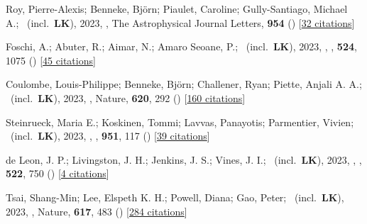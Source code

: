 \item[{\color{numcolor}\scriptsize93}] Roy, Pierre-Alexis; Benneke, Bj{\"o}rn; Piaulet, Caroline; Gully-Santiago, Michael A.; \etal\ (incl.\ \textbf{LK}), 2023, , The Astrophysical Journal Letters, \textbf{954} () [\href{https://ui.adsabs.harvard.edu/abs/2023ApJ...954L..52R}{32 citations}]

\item[{\color{numcolor}\scriptsize92}] Foschi, A.; Abuter, R.; Aimar, N.; Amaro Seoane, P.; \etal\ (incl.\ \textbf{LK}), 2023, , \mnras, \textbf{524}, 1075 () [\href{https://ui.adsabs.harvard.edu/abs/2023MNRAS.524.1075F}{45 citations}]

\item[{\color{numcolor}\scriptsize91}] Coulombe, Louis-Philippe; Benneke, Bj{\"o}rn; Challener, Ryan; Piette, Anjali A. A.; \etal\ (incl.\ \textbf{LK}), 2023, , Nature, \textbf{620}, 292 () [\href{https://ui.adsabs.harvard.edu/abs/2023Natur.620..292C}{160 citations}]

\item[{\color{numcolor}\scriptsize90}] Steinrueck, Maria E.; Koskinen, Tommi; Lavvas, Panayotis; Parmentier, Vivien; \etal\ (incl.\ \textbf{LK}), 2023, , \apj, \textbf{951}, 117 () [\href{https://ui.adsabs.harvard.edu/abs/2023ApJ...951..117S}{39 citations}]

\item[{\color{numcolor}\scriptsize89}] de Leon, J. P.; Livingston, J. H.; Jenkins, J. S.; Vines, J. I.; \etal\ (incl.\ \textbf{LK}), 2023, , \mnras, \textbf{522}, 750 () [\href{https://ui.adsabs.harvard.edu/abs/2023MNRAS.522..750D}{4 citations}]

\item[{\color{numcolor}\scriptsize88}] Tsai, Shang-Min; Lee, Elspeth K. H.; Powell, Diana; Gao, Peter; \etal\ (incl.\ \textbf{LK}), 2023, , Nature, \textbf{617}, 483 () [\href{https://ui.adsabs.harvard.edu/abs/2023Natur.617..483T}{284 citations}]

